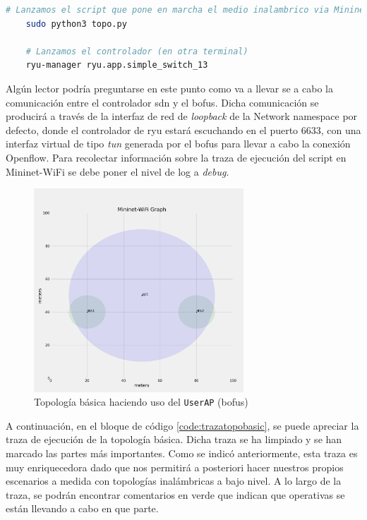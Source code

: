 \begin{lstlisting}[language= bash, style=Consola, caption={Puesta en marcha del escenario básico},label=code:topoBasic]
    # Lanzamos el script que pone en marcha el medio inalambrico via Mininet-WiFi
    sudo python3 topo.py
   
    # Lanzamos el controlador (en otra terminal)
    ryu-manager ryu.app.simple_switch_13
\end{lstlisting}
\vspace{0.5cm}

Algún lector podría preguntarse en este punto como va a llevar se a cabo la comunicación entre el controlador \gls{sdn} y el \gls{bofus}. Dicha comunicación se producirá a través de la interfaz de red de \textit{loopback} de la Network namespace por defecto, donde el controlador de ryu estará escuchando en el puerto 6633, con una interfaz virtual de tipo \textit{tun} generada por el \gls{bofus} para llevar a cabo la conexión Openflow.  Para recolectar información sobre la traza de ejecución del script en Mininet-WiFi se debe poner el nivel de log a \textit{debug}.
\begin{figure}[ht!]
    \centering
    \includegraphics[width=0.7\textwidth]{archivos/img/analisis/topoBasic.png}
    \caption{Topología básica haciendo uso del \texttt{UserAP} (\gls{bofus})}
    \label{fig:topoBasic}
\end{figure}


A continuación, en el bloque de código \ref{code:trazatopobasic}, se puede apreciar la traza de ejecución de la topología básica. Dicha traza se ha limpiado y se han marcado las partes más importantes. Como se indicó anteriormente, esta traza es muy enriquecedora dado que nos permitirá a posteriori hacer nuestros propios escenarios a medida con topologías inalámbricas a bajo nivel. A lo largo de la traza, se podrán encontrar comentarios en verde que indican que operativas se están llevando a cabo en que parte.


